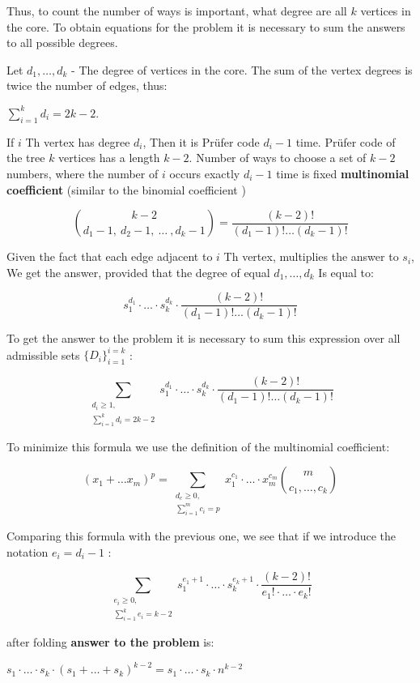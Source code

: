 Thus, to count the number of ways is important, what degree are all $k$ vertices in the core. To obtain equations for the problem it is necessary to sum the answers to all possible degrees.

Let $d_1, \ldots, d_k$ - The degree of vertices in the core. The sum of the vertex degrees is twice the number of edges, thus:

$\sum_ {i = 1} ^ k d_i = 2k-2.$

If $i$ Th vertex has degree $d_i$, Then it is Prüfer code $d_i-1$ time. Prüfer code of the tree $k$ vertices has a length $k-2$. Number of ways to choose a set of $k-2$ numbers, where the number of $i$ occurs exactly $d_i-1$ time is fixed \textbf{multinomial coefficient} (similar to the binomial coefficient )

$$\binom{{k-2}}{{d_{1}-1,~d_{2}-1,~\ldots~,d_{k}-1}}=\frac{(k-2)!}{(d_{1}-1)!\ldots(d_{k}-1)!}$$

Given the fact that each edge adjacent to $i$ Th vertex, multiplies the answer to $s_i$, We get the answer, provided that the degree of equal $d_1, \ldots, d_k$ Is equal to:

$$s_{1}^{d_{1}}\cdot\ldots\cdot s_{k}^{d_{k}}\cdot\frac{(k-2)!}{(d_{1}-1)!\ldots(d_{k}-1)!}$$

To get the answer to the problem it is necessary to sum this expression over all admissible sets $\{D_i \} _ {i = 1} ^ {i = k}$ :

$$\sum_{\substack{d_{i}\ge1,\\
\sum_{i=1}^{k}d_{i}=2k-2}
}s_{1}^{d_{1}}\cdot\ldots\cdot s_{k}^{d_{k}}\cdot\frac{(k-2)!}{(d_{1}-1)!\ldots(d_{k}-1)!}$$

To minimize this formula we use the definition of the multinomial coefficient:

$$(x_{1}+\ldots x_{m})^{p}=\sum_{\substack{d_{c}\ge0,\\
\sum_{i=1}^{m}c_{i}=p}
}x_{1}^{c_{1}}\cdot\ldots\cdot x_{m}^{c_{m}}\binom{m}{c_{1},\ldots,c_{k}}$$

Comparing this formula with the previous one, we see that if we introduce the notation $e_i = d_i-1$ :

$$\sum_{\substack{e_{i}\ge0,\\
\sum_{i=1}^{k}e_{i}=k-2}
}s_{1}^{e_{1}+1}\cdot\ldots\cdot s_{k}^{e_{k}+1}\cdot\frac{(k-2)!}{e_{1}!\cdot\ldots\cdot e_{k}!}$$

after folding \textbf{answer to the problem} is:

$s_{1}\cdot\ldots\cdot s_{k}\cdot(s_{1}+\ldots+s_{k})^{k-2}=s_{1}\cdot\ldots\cdot s_{k}\cdot n^{k-2}$

